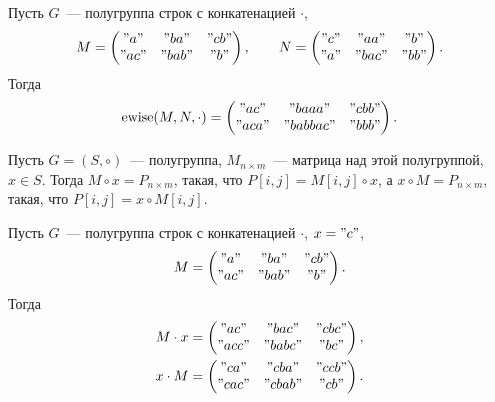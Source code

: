 \begin{example}
    Пусть $G$~--- полугруппа строк с конкатенацией $\cdot$,
    \[M =
        \begin{pmatrix}
            "a"  & "ba"  & "cb" \\
            "ac" & "bab" & "b"
        \end{pmatrix},
        \qquad
        N =
        \begin{pmatrix}
            "c" & "aa"  & "b"  \\
            "a" & "bac" & "bb"
        \end{pmatrix}.
    \]
    Тогда
    \[
        \mathrm{ewise}(M, N, \cdot) =
        \begin{pmatrix}
            "ac"  & "baaa"   & "cbb" \\
            "aca" & "babbac" & "bbb"
        \end{pmatrix}.
    \]
\end{example}

\begin{definition}
    Пусть $G = (S, \circ)$~--- полугруппа, $M_{n \times m}$~--- матрица над этой полугруппой, $x \in S$.
    Тогда $ M \circ x = P_{n \times m}$, такая, что $P[i, j] = M[i, j] \circ x$, а $x \circ M = P_{n \times m}$, такая, что $P[i, j] = x \circ M[i, j]$.
\end{definition}

\begin{example}
    Пусть $G$~--- полугруппа строк с конкатенацией $\cdot$, $x = "c"$,
    \[
        M =
        \begin{pmatrix}
            "a"  & "ba"  & "cb" \\
            "ac" & "bab" & "b"
        \end{pmatrix}.
    \]
    Тогда
    \begin{gather*}
        M \cdot x =
        \begin{pmatrix}
            "ac"  & "bac"  & "cbc" \\
            "acc" & "babc" & "bc"
        \end{pmatrix},\\
        x \cdot M =
        \begin{pmatrix}
            "ca"  & "cba"  & "ccb" \\
            "cac" & "cbab" & "cb"
        \end{pmatrix}.
    \end{gather*}
\end{example}

